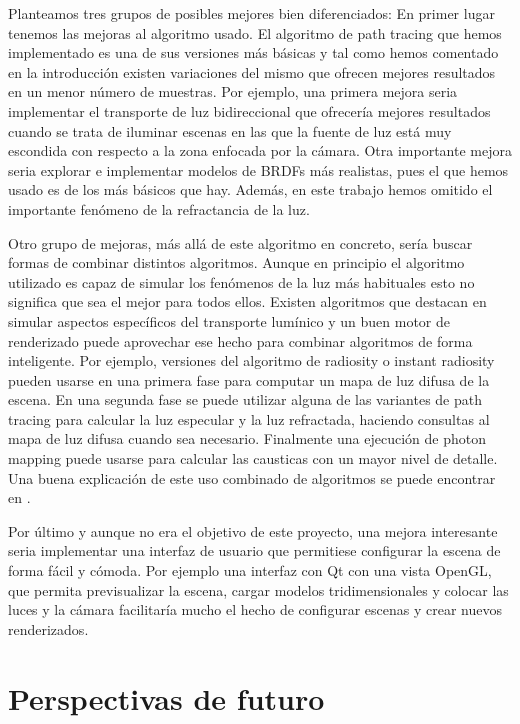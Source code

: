 Planteamos tres grupos de posibles mejores bien diferenciados: En primer lugar tenemos las mejoras al algoritmo usado. El algoritmo de path tracing que hemos implementado es una de sus versiones más básicas y tal como hemos comentado en la introducción existen variaciones del mismo que ofrecen mejores resultados en un menor número de muestras. Por ejemplo, una primera mejora seria implementar el transporte de luz bidireccional que ofrecería mejores resultados cuando se trata de iluminar escenas en las que la fuente de luz está muy escondida con respecto a la zona enfocada por la cámara. Otra importante mejora seria explorar e implementar modelos de BRDFs más realistas, pues el que hemos usado es de los más básicos que hay. Además, en este trabajo hemos omitido el importante fenómeno de la refractancia de la luz.

\medskip

Otro grupo de mejoras, más allá de este algoritmo en concreto, sería buscar formas de combinar distintos algoritmos. Aunque en principio el algoritmo utilizado es capaz de simular los fenómenos de la luz más habituales esto no significa que sea el mejor para todos ellos. Existen algoritmos que destacan en simular aspectos específicos del transporte lumínico y un buen motor de renderizado puede aprovechar ese hecho para combinar algoritmos de forma inteligente. Por ejemplo, versiones del algoritmo de radiosity o instant radiosity pueden usarse en una primera fase para computar un mapa de luz difusa de la escena. En una segunda fase se puede utilizar alguna de las variantes de path tracing para calcular la luz especular y la luz refractada, haciendo consultas al mapa de luz difusa cuando sea necesario. Finalmente una ejecución de photon mapping puede usarse para calcular las causticas con un mayor nivel de detalle.
Una buena explicación de este uso combinado de algoritmos se puede encontrar en \cite{Hery2013}.

\medskip

Por último y aunque no era el objetivo de este proyecto, una mejora interesante seria implementar una interfaz de usuario que permitiese configurar la escena de forma fácil y cómoda. Por ejemplo una interfaz con Qt con una vista OpenGL, que permita previsualizar la escena, cargar modelos tridimensionales y colocar las luces y la cámara facilitaría mucho el hecho de configurar escenas y crear nuevos renderizados.

\clearpage

\section{Perspectivas de futuro}

